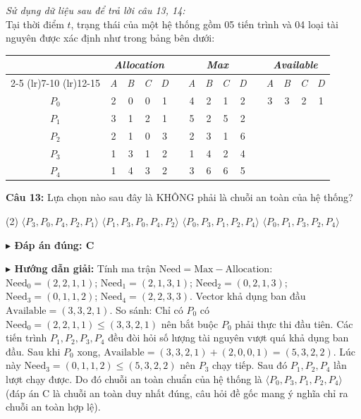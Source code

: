 \documentclass[11pt,a4paper]{article}
\newcommand{\giaithich}[2]{%
    \par\vspace{0.15cm}\noindent
    \begingroup\small
    \noindent\textbf{\color{blue}$\blacktriangleright$ Đáp án đúng: #1} \par\vspace{0.08cm}
    \noindent\textbf{\color{teal}$\blacktriangleright$ Hướng dẫn giải:} #2
    \endgroup\par\vspace{0.35cm}
}
\begin{document}
\vspace{0.3cm}
\noindent\textit{Sử dụng dữ liệu sau để trả lời câu 13, 14:}\\
Tại thời điểm $t$, trạng thái của một hệ thống gồm 05 tiến trình và 04 loại tài nguyên được xác định như trong bảng bên dưới:
\begin{center}
\begin{tabular}{c cccc c cccc c cccc}
\toprule
& \multicolumn{4}{c}{\textbf{\textit{Allocation}}} & & \multicolumn{4}{c}{\textbf{\textit{Max}}} & & \multicolumn{4}{c}{\textbf{\textit{Available}}} \\
\cmidrule(lr){2-5} \cmidrule(lr){7-10} \cmidrule(lr){12-15}
& \textit{A} & \textit{B} & \textit{C} & \textit{D} & & \textit{A} & \textit{B} & \textit{C} & \textit{D} & & \textit{A} & \textit{B} & \textit{C} & \textit{D} \\
\midrule
$P_0$ & 2 & 0 & 0 & 1 & & 4 & 2 & 1 & 2 & & 3 & 3 & 2 & 1 \\
$P_1$ & 3 & 1 & 2 & 1 & & 5 & 2 & 5 & 2 & & & & & \\
$P_2$ & 2 & 1 & 0 & 3 & & 2 & 3 & 1 & 6 & & & & & \\
$P_3$ & 1 & 3 & 1 & 2 & & 1 & 4 & 2 & 4 & & & & & \\
$P_4$ & 1 & 4 & 3 & 2 & & 3 & 6 & 6 & 5 & & & & & \\
\bottomrule
\end{tabular}
\end{center}

\noindent\textbf{Câu 13:} Lựa chọn nào sau đây là KHÔNG phải là chuỗi an toàn của hệ thống?
\begin{tasks}(2)
    \task $\langle P_3, P_0, P_4, P_2, P_1 \rangle$
    \task $\langle P_1, P_3, P_0, P_4, P_2 \rangle$
    \task $\langle P_0, P_3, P_1, P_2, P_4 \rangle$
    \task $\langle P_0, P_1, P_3, P_2, P_4 \rangle$
\end{tasks}
\giaithich{C}{Tính ma trận $\text{Need} = \text{Max} - \text{Allocation}$:
$\text{Need}_0 = (2, 2, 1, 1)$; $\text{Need}_1 = (2, 1, 3, 1)$; $\text{Need}_2 = (0, 2, 1, 3)$; $\text{Need}_3 = (0, 1, 1, 2)$; $\text{Need}_4 = (2, 2, 3, 3)$.
Vector khả dụng ban đầu $\text{Available} = (3, 3, 2, 1)$.
So sánh: Chỉ có $P_0$ có $\text{Need}_0 = (2, 2, 1, 1) \le (3, 3, 2, 1)$ nên bắt buộc $P_0$ phải thực thi đầu tiên. Các tiến trình $P_1, P_2, P_3, P_4$ đều đòi hỏi số lượng tài nguyên vượt quá khả dụng ban đầu.
Sau khi $P_0$ xong, $\text{Available} = (3,3,2,1) + (2,0,0,1) = (5,3,2,2)$. Lúc này $\text{Need}_3 = (0, 1, 1, 2) \le (5, 3, 2, 2)$ nên $P_3$ chạy tiếp. Sau đó $P_1, P_2, P_4$ lần lượt chạy được. Do đó chuỗi an toàn chuẩn của hệ thống là $\langle P_0, P_3, P_1, P_2, P_4 \rangle$ (đáp án C là chuỗi an toàn duy nhất đúng, câu hỏi đề gốc mang ý nghĩa chỉ ra chuỗi an toàn hợp lệ).}
\end{document}
